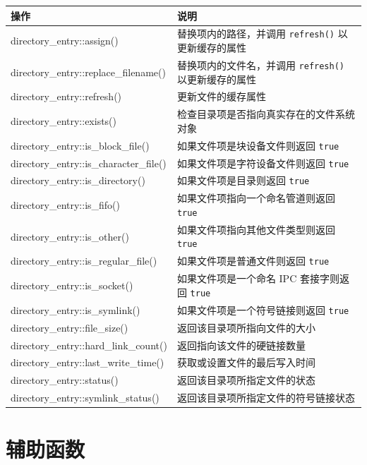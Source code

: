 \begin{table}[H]
\centering
\begin{tabularx}{\textwidth}{>{\ttfamily\raggedright\arraybackslash}X >{\raggedright\arraybackslash}X}
\toprule
操作 & 说明 \\
\midrule
directory\_entry::assign() & 替换项内的路径，并调用 \texttt{refresh()} 以更新缓存的属性 \\
directory\_entry::replace\_filename() & 替换项内的文件名，并调用 \texttt{refresh()} 以更新缓存的属性 \\
directory\_entry::refresh() & 更新文件的缓存属性 \\
directory\_entry::exists() & 检查目录项是否指向真实存在的文件系统对象 \\
directory\_entry::is\_block\_file() & 如果文件项是块设备文件则返回 \texttt{true} \\
directory\_entry::is\_character\_file() & 如果文件项是字符设备文件则返回 \texttt{true} \\
directory\_entry::is\_directory() & 如果文件项是目录则返回 \texttt{true} \\
directory\_entry::is\_fifo() & 如果文件项指向一个命名管道则返回 \texttt{true} \\
directory\_entry::is\_other() & 如果文件项指向其他文件类型则返回 \texttt{true} \\
directory\_entry::is\_regular\_file() & 如果文件项是普通文件则返回 \texttt{true} \\
directory\_entry::is\_socket() & 如果文件项是一个命名 IPC 套接字则返回 \texttt{true} \\
directory\_entry::is\_symlink() & 如果文件项是一个符号链接则返回 \texttt{true} \\
directory\_entry::file\_size() & 返回该目录项所指向文件的大小 \\
directory\_entry::hard\_link\_count() & 返回指向该文件的硬链接数量 \\
directory\_entry::last\_write\_time() & 获取或设置文件的最后写入时间 \\
directory\_entry::status() & 返回该目录项所指定文件的状态 \\
directory\_entry::symlink\_status() & 返回该目录项所指定文件的符号链接状态 \\
\bottomrule
\end{tabularx}
\end{table}

\section{辅助函数}

